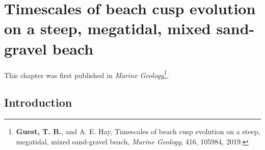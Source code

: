 \chapter{Timescales of beach cusp evolution on a steep, megatidal, mixed sand-gravel beach}\label{Chapter:CuspDynamics}

%
%

This chapter was first published in \textit{Marine Geology}\footnote{\textbf{Guest, T. B.}, and A. E. Hay, Timescales of beach cusp evolution on a steep, megatidal, mixed sand-gravel beach, \textit{Marine Geology}, 416, 105984, 2019.}.


\section{Introduction}

